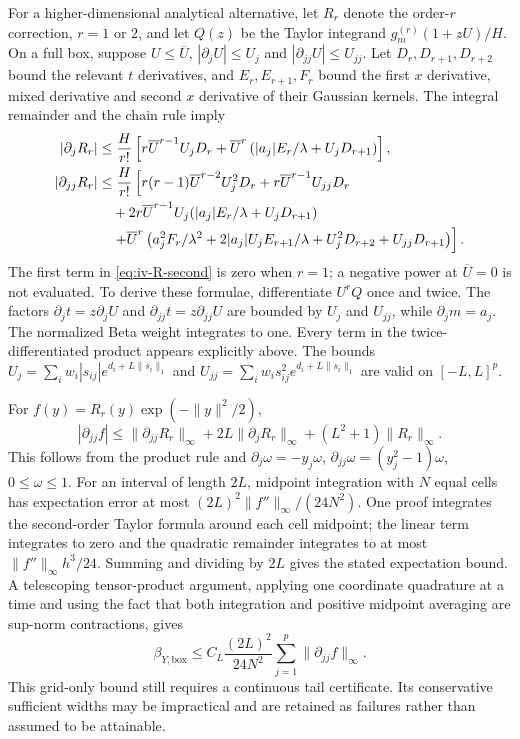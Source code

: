 For a higher-dimensional analytical alternative, let $R_r$ denote the
order-$r$ correction, $r=1$ or $2$, and let $Q(z)$ be the Taylor integrand
$g_m^{(r)}(1+zU)/H$.  On a full box, suppose $U\leq\overline U$,
$|\partial_jU|\leq U_j$ and $|\partial_{jj}U|\leq U_{jj}$.
Let $D_r,D_{r+1},D_{r+2}$ bound the relevant $t$ derivatives, and
$E_r,E_{r+1},F_r$ bound the first $x$ derivative, mixed derivative and
second $x$ derivative of their Gaussian kernels.  The integral remainder
and the chain rule imply
\begin{align}
 |\partial_jR_r|&\leq\frac H{r!}
 \left[r\overline U^{r-1}U_jD_r+
 \overline U^r\left(|a_j|E_r/\lambda+U_jD_{r+1}\right)\right],
 \label{eq:iv-R-first}\\
 |\partial_{jj}R_r|&\leq\frac H{r!}\left[
 r(r-1)\overline U^{r-2}U_j^2D_r+
 r\overline U^{r-1}U_{jj}D_r\right.\notag\\
 &\quad+2r\overline U^{r-1}U_j
           (|a_j|E_r/\lambda+U_jD_{r+1})\notag\\
 &\quad\left.+\overline U^r\left(
 a_j^2F_r/\lambda^2+2|a_j|U_jE_{r+1}/\lambda+
 U_j^2D_{r+2}+U_{jj}D_{r+1}\right)\right].
 \label{eq:iv-R-second}
\end{align}
The first term in \eqref{eq:iv-R-second} is zero when $r=1$; a negative
power at $\overline U=0$ is not evaluated.  To derive these formulae,
differentiate $U^rQ$ once and twice.  The factors $\partial_jt=z\partial_jU$
and $\partial_{jj}t=z\partial_{jj}U$ are bounded by $U_j$ and $U_{jj}$,
while $\partial_jm=a_j$.  The normalized Beta weight integrates to one.
Every term in the twice-differentiated product appears explicitly above.
The bounds $U_j=\sum_iw_i|s_{ij}|e^{d_i+L\|s_i\|_1}$ and
$U_{jj}=\sum_iw_is_{ij}^2e^{d_i+L\|s_i\|_1}$ are valid on $[-L,L]^p$.

For $f(y)=R_r(y)\exp(-\|y\|^2/2)$,
\begin{equation}
 |\partial_{jj}f|\leq
 \|\partial_{jj}R_r\|_\infty+
 2L\|\partial_jR_r\|_\infty+(L^2+1)\|R_r\|_\infty.
 \label{eq:iv-density-second}
\end{equation}
This follows from the product rule and
$\partial_j\omega=-y_j\omega$,
$\partial_{jj}\omega=(y_j^2-1)\omega$, $0\leq\omega\leq1$.
For an interval of length $2L$, midpoint integration with $N$ equal cells
has expectation error at most $(2L)^2\|f''\|_\infty/(24N^2)$.
One proof integrates the second-order Taylor formula around each cell midpoint;
the linear term integrates to zero and the quadratic remainder integrates
to at most $\|f''\|_\infty h^3/24$.  Summing and dividing by $2L$ gives
the stated expectation bound.  A telescoping tensor-product argument,
applying one coordinate quadrature at a time and using the fact that both
integration and positive midpoint averaging are sup-norm contractions, gives
\begin{equation}
 \beta_{Y,\mathrm{box}}\leq
 C_L\frac{(2L)^2}{24N^2}\sum_{j=1}^p
 \|\partial_{jj}f\|_\infty.
 \label{eq:iv-box-midpoint}
\end{equation}
This grid-only bound still requires a continuous tail certificate.  Its
conservative sufficient widths may be impractical and are retained as failures
rather than assumed to be attainable.

